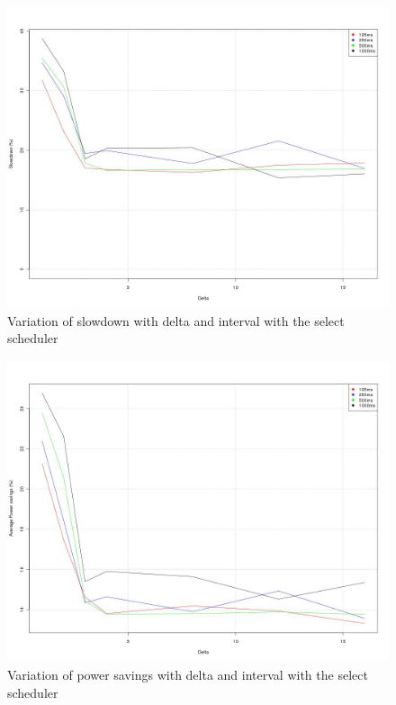 \begin{figure}[h!]
  \begin{center}
    \includegraphics[height=3.5in]{figures/trends_slowdown_select.jpg}%
    \caption{Variation of slowdown with delta and interval with the select scheduler}
    \label{fig:slowdown_trends_select}
  \end{center}
\end{figure}

\begin{figure}[h!]
  \begin{center}
    \includegraphics[height=3.5in]{figures/trends_avgpwr_select.jpg}%
    \caption{Variation of power savings with delta and interval with the select scheduler}
    \label{fig:pwr_trends_select}
  \end{center}
\end{figure}


